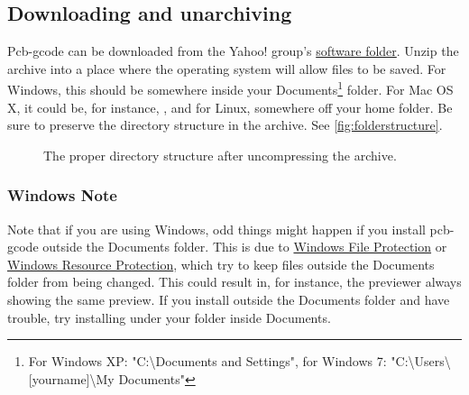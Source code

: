 \documentclass[11pt]{book}
\begin{document}
\subsection{Downloading and unarchiving}
Pcb-gcode can be downloaded from the Yahoo! group's \href{http://groups.yahoo.com/group/pcb-gcode/files/\%21\%20Software}{software folder}.  Unzip the archive into a place where the operating system will allow files to be saved. For Windows, this should be somewhere inside your Documents\footnote{For Windows XP: "C:\textbackslash{}Documents and Settings", for Windows 7: "C:\textbackslash{}Users\textbackslash{}[yourname]\textbackslash{}My Documents" } folder. For Mac OS X, it could be, for instance, , and for Linux, somewhere off your home folder. Be sure to preserve the directory structure in the archive. See \figurename \vref{fig:folderstructure}.

\begin{figure}
	\caption{The proper directory structure after uncompressing the archive.}
	\label{fig:folderstructure}
\end{figure}

\subsubsection{Windows Note}
Note that if you are using Windows, odd things might happen if you install pcb-gcode outside the Documents folder. This is due to \href{http://en.wikipedia.org/wiki/Windows_File_Protection}{Windows File Protection} or \href{http://en.wikipedia.org/wiki/Windows_Resource_Protection}{Windows Resource Protection}, which try to keep files outside the Documents folder from being changed. This could result in, for instance, the previewer always showing the same preview. If you install outside the Documents folder and have trouble, try installing under your folder inside Documents. 
\end{document}
